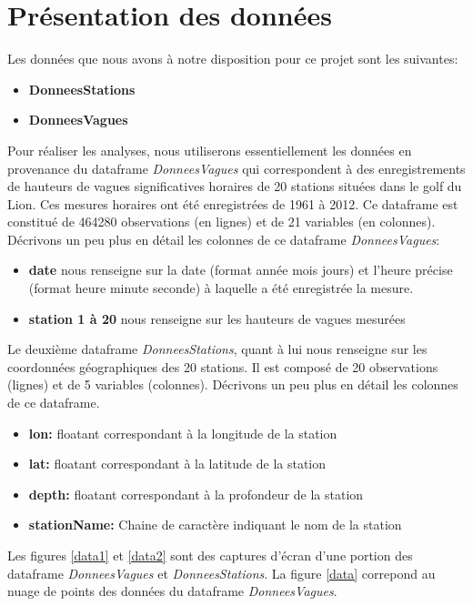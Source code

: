 \documentclass[a4paper,french,10pt]{article}
\begin{document}
\newpage

\section{Présentation des données}

Les données que nous avons à notre disposition pour ce projet sont les suivantes:
\begin{itemize}
	\item \textbf{DonneesStations}
	\item \textbf{DonneesVagues}
\end{itemize}
Pour réaliser les analyses, nous utiliserons essentiellement les données en provenance du dataframe \textit{DonneesVagues} qui correspondent à des enregistrements de hauteurs de vagues significatives horaires de 20 stations situées dans le golf du Lion. Ces mesures horaires ont été enregistrées de 1961 à 2012. Ce dataframe est constitué de 464280 observations (en lignes) et de 21 variables (en colonnes). Décrivons un peu plus en détail les colonnes de ce dataframe \textit{DonneesVagues}:
\begin{itemize}
	\item \textbf{date} nous renseigne sur la date (format année mois jours) et l'heure précise (format heure minute seconde) à laquelle a été enregistrée la mesure.
	\item \textbf{station 1 à 20} nous renseigne sur les hauteurs de vagues mesurées
\end{itemize}
Le deuxième dataframe \textit{DonneesStations}, quant à lui nous renseigne sur les coordonnées géographiques des 20 stations. Il est composé de 20 observations (lignes) et de 5 variables (colonnes). Décrivons un peu plus en détail les colonnes de ce dataframe.
\begin{itemize}
	\item \textbf{lon:} floatant correspondant à la longitude de la station
	\item \textbf{lat:} floatant correspondant à la latitude de la station
	\item \textbf{depth:} floatant correspondant à la profondeur de la station
	\item \textbf{stationName:} Chaine de caractère indiquant le nom de la station
\end{itemize}
Les figures \ref{data1} et \ref{data2} sont des captures d'écran d'une portion des dataframe \textit{DonneesVagues} et \textit{DonneesStations}. La figure \ref{data} correpond au nuage de points des données du dataframe \textit{DonneesVagues}.
\end{document}
